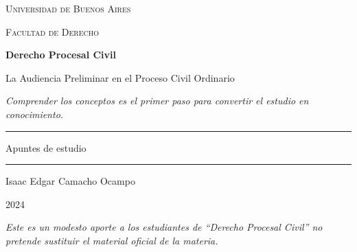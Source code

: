\documentclass[12pt,oneside]{book}
\newcommand{\universidad}{Universidad de Buenos Aires}
\newcommand{\facultad}{Facultad de Derecho}
\newcommand{\materia}{Derecho Procesal Civil}
\newcommand{\titulo}{La Audiencia Preliminar en el Proceso Civil Ordinario}
\newcommand{\autor}{Isaac Edgar Camacho Ocampo}
\newcommand{\anio}{2024}
\begin{document}
\begin{titlepage}

\thispagestyle{empty}

\begin{center}

\vspace*{1cm}

{\large \textsc{\universidad}}

\vspace{0.2cm}

{\large \textsc{\facultad}}

\vspace{3cm}

{\Huge \textbf{\materia}}

\vspace{1cm}

{\LARGE \titulo}

\vspace{0.8cm}

\textit{Comprender los conceptos es el primer paso para convertir el estudio en conocimiento.}

\vspace{1.2cm}

\rule{0.70\textwidth}{0.5pt}

\vspace{0.5cm}

{\large Apuntes de estudio}

\vspace{0.5cm}

\rule{0.70\textwidth}{0.5pt}

\vfill

{\large \autor}

\vspace{0.3cm}

{\large \anio}

\end{center}

\vfill

\begin{flushleft}
\textit{Este es un modesto aporte a los estudiantes de ``Derecho Procesal Civil'' no pretende sustituir el material oficial de la materia.}
\end{flushleft}

\end{titlepage}

\tableofcontents
\end{document}
